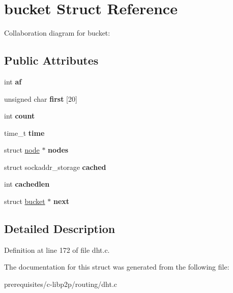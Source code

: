\hypertarget{structbucket}{}\section{bucket Struct Reference}
\label{structbucket}


Collaboration diagram for bucket\+:
\subsection*{Public Attributes}
\begin{DoxyCompactItemize}
\item 
\mbox{\label{structbucket_ab6266a0965d057d2bbff8bd484c825b3}} 
int {\bfseries af}
\item 
\mbox{\label{structbucket_af1a30c9040b66c0e1d50a93991464c0e}} 
unsigned char {\bfseries first} \mbox{[}20\mbox{]}
\item 
\mbox{\label{structbucket_ae99e167f414e16c00c0314ff4ecf41ba}} 
int {\bfseries count}
\item 
\mbox{\label{structbucket_a15e96e666ba847009b97a5cee7c2496c}} 
time\+\_\+t {\bfseries time}
\item 
\mbox{\label{structbucket_ac2bdff921fcb02d7514a999bcadc9bc5}} 
struct \mbox{\hyperlink{structnode}{node}} $\ast$ {\bfseries nodes}
\item 
\mbox{\label{structbucket_a65c1939a85f87fe2dbe283b5fc23d048}} 
struct sockaddr\+\_\+storage {\bfseries cached}
\item 
\mbox{\label{structbucket_acb1518f5eb913d44ff4f74de25b7450e}} 
int {\bfseries cachedlen}
\item 
\mbox{\label{structbucket_a70c4dfb30de550c0caf1ce95f5e8803f}} 
struct \mbox{\hyperlink{structbucket}{bucket}} $\ast$ {\bfseries next}
\end{DoxyCompactItemize}


\subsection{Detailed Description}


Definition at line 172 of file dht.\+c.



The documentation for this struct was generated from the following file\+:\begin{DoxyCompactItemize}
\item 
prerequisites/c-\/libp2p/routing/dht.\+c\end{DoxyCompactItemize}
